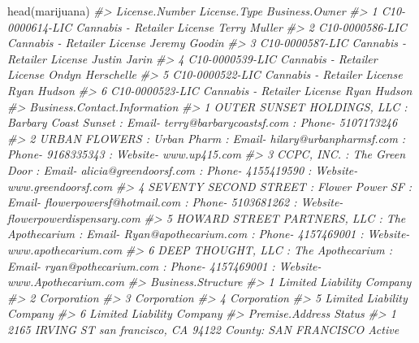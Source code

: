 \documentclass[
]{krantz}
\makeatletter
\newenvironment{Shaded}{\begin{snugshade}}{\end{snugshade}}
\newcommand{\CommentTok}[1]{\textcolor[rgb]{0.37,0.37,0.37}{\textit{#1}}}
\newcommand{\FunctionTok}[1]{\textcolor[rgb]{0,0,0}{#1}}
\newcommand{\NormalTok}[1]{#1}
\newenvironment{kframe}{%
\medskip{}
\setlength{\fboxsep}{.8em}
 \def\at@end@of@kframe{}%
 \ifinner\ifhmode%
  \def\at@end@of@kframe{\end{minipage}}%
  \begin{minipage}{\columnwidth}%
 \fi\fi%
 \def\FrameCommand##1{\hskip\@totalleftmargin \hskip-\fboxsep
 \colorbox{shadecolor}{##1}\hskip-\fboxsep
     \hskip-\linewidth \hskip-\@totalleftmargin \hskip\columnwidth}%
 \MakeFramed {\advance\hsize-\width
   \@totalleftmargin\z@ \linewidth\hsize
   \@setminipage}}%
 {\par\unskip\endMakeFramed%
 \at@end@of@kframe}
\renewenvironment{Shaded}{\begin{kframe}}{\end{kframe}}
\makeatother
\begin{document}
\begin{Shaded}
\begin{Highlighting}[]
\FunctionTok{head}\NormalTok{(marijuana)}
\CommentTok{\#\textgreater{}    License.Number                License.Type   Business.Owner}
\CommentTok{\#\textgreater{} 1 C10{-}0000614{-}LIC Cannabis {-} Retailer License     Terry Muller}
\CommentTok{\#\textgreater{} 2 C10{-}0000586{-}LIC Cannabis {-} Retailer License    Jeremy Goodin}
\CommentTok{\#\textgreater{} 3 C10{-}0000587{-}LIC Cannabis {-} Retailer License     Justin Jarin}
\CommentTok{\#\textgreater{} 4 C10{-}0000539{-}LIC Cannabis {-} Retailer License Ondyn Herschelle}
\CommentTok{\#\textgreater{} 5 C10{-}0000522{-}LIC Cannabis {-} Retailer License      Ryan Hudson}
\CommentTok{\#\textgreater{} 6 C10{-}0000523{-}LIC Cannabis {-} Retailer License      Ryan Hudson}
\CommentTok{\#\textgreater{}                                                                                                           Business.Contact.Information}
\CommentTok{\#\textgreater{} 1                             OUTER SUNSET HOLDINGS, LLC  : Barbary Coast Sunset : Email{-} terry@barbarycoastsf.com : Phone{-} 5107173246}
\CommentTok{\#\textgreater{} 2                           URBAN FLOWERS  : Urban Pharm : Email{-} hilary@urbanpharmsf.com : Phone{-} 9168335343 : Website{-} www.up415.com}
\CommentTok{\#\textgreater{} 3                      CCPC, INC.  : The Green Door : Email{-} alicia@greendoorsf.com : Phone{-} 4155419590 : Website{-} www.greendoorsf.com}
\CommentTok{\#\textgreater{} 4 SEVENTY SECOND STREET  : Flower Power SF : Email{-} flowerpowersf@hotmail.com : Phone{-} 5103681262 : Website{-} flowerpowerdispensary.com}
\CommentTok{\#\textgreater{} 5   HOWARD STREET PARTNERS, LLC  : The Apothecarium : Email{-} Ryan@apothecarium.com : Phone{-} 4157469001 : Website{-} www.apothecarium.com}
\CommentTok{\#\textgreater{} 6              DEEP THOUGHT, LLC  : The Apothecarium : Email{-} ryan@pothecarium.com : Phone{-} 4157469001 : Website{-} www.Apothecarium.com}
\CommentTok{\#\textgreater{}          Business.Structure}
\CommentTok{\#\textgreater{} 1 Limited Liability Company}
\CommentTok{\#\textgreater{} 2               Corporation}
\CommentTok{\#\textgreater{} 3               Corporation}
\CommentTok{\#\textgreater{} 4               Corporation}
\CommentTok{\#\textgreater{} 5 Limited Liability Company}
\CommentTok{\#\textgreater{} 6 Limited Liability Company}
\CommentTok{\#\textgreater{}                                                 Premise.Address Status}
\CommentTok{\#\textgreater{} 1  2165 IRVING ST san francisco, CA 94122 County: SAN FRANCISCO Active}

\end{Highlighting}
\end{Shaded}
\end{document}
